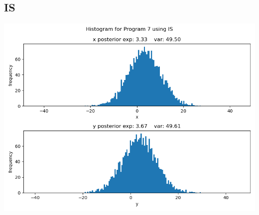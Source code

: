 \documentclass[10pt]{homeworg}
\begin{document}
\subsection{IS}
\begin{center}
\includegraphics[scale=0.5]{figures/IS_program_7.png}
\end{center}
\end{document}
